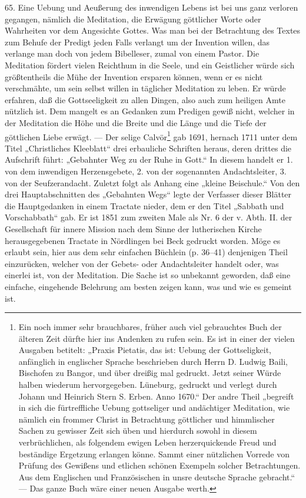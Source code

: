 65. Eine Uebung und Aeußerung des inwendigen Lebens ist bei uns ganz verloren gegangen, nämlich die Meditation, die Erwägung göttlicher Worte oder Wahrheiten vor dem Angesichte Gottes. Was man bei der Betrachtung des Textes zum Behufe der Predigt jeden Falls verlangt um der Invention willen, das verlange man doch von jedem Bibelleser, zumal von einem Pastor. Die Meditation fördert vielen Reichthum in die Seele, und ein Geistlicher würde sich größtentheils die Mühe der Invention ersparen können, wenn er es nicht verschmähte, um sein selbst willen in täglicher Meditation zu leben. Er würde erfahren, daß die Gottseeligkeit zu allen Dingen, also auch zum heiligen Amte nützlich ist. Dem mangelt es an Gedanken zum Predigen gewiß nicht, welcher in der Meditation die Höhe und die Breite und die Länge und die Tiefe der göttlichen Liebe erwägt. — Der selige Calvör\footnote{Ein noch immer sehr brauchbares, früher auch viel gebrauchtes Buch der älteren Zeit dürfte hier ins Andenken zu rufen sein. Es ist in einer der vielen Ausgaben betitelt: „Praxis Pietatis, das ist: Uebung der Gottseligkeit, anfänglich in englischer Sprache beschrieben durch Herrn D. Ludwig Baili, Bischofen zu Bangor, und über dreißig mal gedruckt. Jetzt seiner Würde halben wiederum hervorgegeben. Lüneburg, gedruckt und verlegt durch Johann und Heinrich Stern S. Erben. Anno 1670.“ Der andre Theil „begreift in sich die fürtreffliche Uebung gottseliger und andächtiger Meditation, wie nämlich ein frommer Christ in Betrachtung göttlicher und himmlischer Sachen zu gewisser Zeit sich üben und hierdurch sowohl in diesem verbrüchlichen, als folgendem ewigen Leben herzerquickende Freud und beständige Ergetzung erlangen könne. Sammt einer nützlichen Vorrede von Prüfung des Gewißens und etlichen schönen Exempeln solcher Betrachtungen. Aus dem Englischen und Französischen in unsre deutsche Sprache gebracht.“ — Das ganze Buch wäre einer neuen Ausgabe werth.} gab 1691, hernach 1711 unter dem Titel „Christliches
Kleeblatt“ drei erbauliche Schriften heraus, deren drittes die Aufschrift führt: „Gebahnter Weg zu der Ruhe in Gott.“ In diesem handelt er 1. von dem inwendigen Herzensgebete, 2. von der sogenannten Andachtsleiter, 3. von der Seufzerandacht. Zuletzt folgt als Anhang eine „kleine Beischule.“ Von den drei Hauptabschnitten des „Gebahnten Wegs“ legte der Verfasser dieser Blätter die Hauptgedanken in einem Tractate nieder, dem er den Titel „Sabbath und Vorschabbath“ gab. Er ist 1851 zum zweiten Male als Nr. 6 der v. Abth. II. der Gesellschaft für innere Mission nach dem Sinne der lutherischen Kirche herausgegebenen Tractate in Nördlingen bei Beck gedruckt worden. Möge es erlaubt sein, hier aus dem sehr einfachen Büchlein (p. 36–41) denjenigen Theil einzurücken, welcher von der Gebets- oder Andachtsleiter handelt oder, was einerlei ist, von der Meditation. Die Sache ist so unbekannt geworden, daß eine einfache, eingehende Belehrung am besten zeigen kann, was und wie es gemeint ist.

